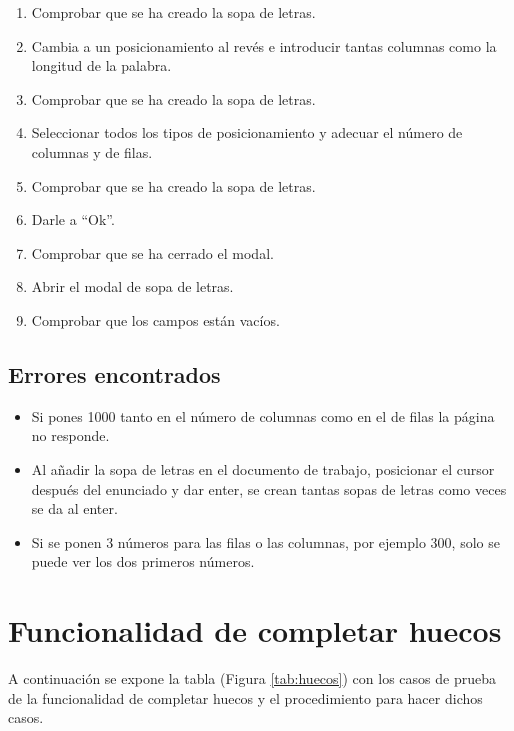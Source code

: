 \begin{enumerate}
    \item Comprobar que se ha creado la sopa de letras.
    \item Cambia a un posicionamiento al revés e introducir tantas columnas como la longitud de la palabra.
    \item Comprobar que se ha creado la sopa de letras.
    \item Seleccionar todos los tipos de posicionamiento y adecuar el número de columnas y de filas.
    \item Comprobar que se ha creado la sopa de letras.
    \item Darle a ``Ok''.
    \item Comprobar que se ha cerrado el modal.
    \item Abrir el modal de sopa de letras.
    \item Comprobar que los campos están vacíos.
\end{enumerate}

\subsection{Errores encontrados}
\label{errores:sopa}
\begin{itemize}
    \item Si pones 1000 tanto en el número de columnas como en el de filas la página no responde.
    \item Al añadir la sopa de letras en el documento de trabajo, posicionar el cursor después del enunciado y dar enter, se crean tantas sopas de letras como veces se da al enter.
    \item Si se ponen 3 números para las filas o las columnas, por ejemplo 300, solo se puede ver los dos primeros números.
\end{itemize}

\section{Funcionalidad de completar huecos}
\label{planPruebas:huecos}
A continuación se expone la tabla (Figura \ref{tab:huecos}) con los casos de prueba de la funcionalidad de completar huecos y el procedimiento para hacer dichos casos.

